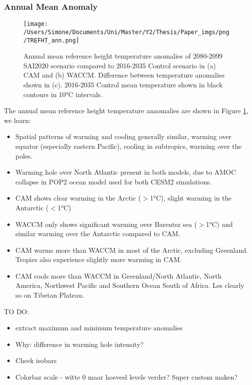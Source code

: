 \subsubsection{Annual Mean Anomaly}

\begin{figure}[H]
	\centering
	\texttt{[image: /Users/Simone/Documents/Uni/Master/Y2/Thesis/Paper\_imgs/png/TREFHT\_ann.png]}
	\caption{Annual mean reference height temperature anomalies of 2080-2099 SAI2020 scenario compared to 2016-2035 Control scenario in (a) CAM and (b) WACCM. Difference between temperature anomalies shown in (c). 2016-2035 Control mean temperature shown in black contours in 10°C intervals.}
	\label{fig:TREFHT_ann}
\end{figure}

The annual mean reference height temperature anaomalies are shown in Figure \ref{fig:TREFHT_ann}, we learn:

\begin{itemize}
	\item Spatial patterns of warming and cooling generally similar, warming over equator (especially eastern Pacific), cooling in subtropics, warming over the poles.
	\item Warming hole over North Atlantic present in both models, due to AMOC collapse in POP2 ocean model used for both CESM2 simulations. 
	\item CAM shows clear warming in the Arctic ($>$1°C), slight warming in the Antarctic ($<$1°C)
	\item WACCM only shows significant warming over Barentsz sea ($>$1°C) and similar warming over the Antarctic compared to CAM.
	\item CAM warms more than WACCM in most of the Arctic, excluding Greenland. Tropics also experience slightly more warming in CAM.
	\item CAM cools more than WACCM in Greenland/North Atlantic, North America, Northwest Pacific and Southern Ocean South of Africa. Les clearly so on Tibetan Plateau.
\end{itemize}

TO DO:
\begin{itemize}
	\item extract maximum and minimum temperature anomalies
	\item Why: difference in warming hole intensity?
	\item Check isobars
	\item Colorbar scale - witte 0 maar hoeveel levels verder? Super custom maken?
\end{itemize}



